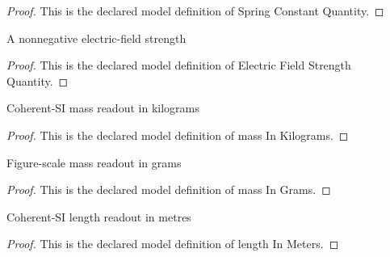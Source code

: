 \begin{proof}
  This is the declared model definition of Spring Constant Quantity.
\end{proof}
\begin{definition}
  \label{def:physics:phyx-mini-0891:phyxminiproblems-problemphyxmini0891-electricfieldstrengthquantity}
  A nonnegative electric-field strength
\end{definition}
\begin{proof}
  This is the declared model definition of Electric Field Strength Quantity.
\end{proof}
\begin{definition}
  \label{def:physics:phyx-mini-0891:phyxminiproblems-problemphyxmini0891-massinkilograms}
  Coherent-SI mass readout in kilograms
\end{definition}
\begin{proof}
  This is the declared model definition of mass In Kilograms.
\end{proof}
\begin{definition}
  \label{def:physics:phyx-mini-0891:phyxminiproblems-problemphyxmini0891-massingrams}
  Figure-scale mass readout in grams
\end{definition}
\begin{proof}
  This is the declared model definition of mass In Grams.
\end{proof}
\begin{definition}
  \label{def:physics:phyx-mini-0891:phyxminiproblems-problemphyxmini0891-lengthinmeters}
  Coherent-SI length readout in metres
\end{definition}
\begin{proof}
  This is the declared model definition of length In Meters.
\end{proof}
